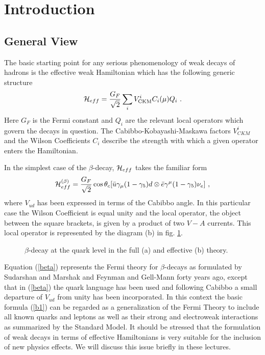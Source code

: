 \documentclass[12pt]{article}
\newcommand{\be}{\begin{equation}}
\newcommand{\ee}{\end{equation}}
\begin{document}
\setcounter{page}{1}

\section{Introduction}
\subsection{General View}
The basic starting point for any serious phenomenology of weak decays of
hadrons is the effective weak Hamiltonian which has the following generic
structure
\be\label{b1}
{\cal H}_{eff}=\frac{G_F}{\sqrt{2}}\sum_i V^i_{\rm CKM}C_i(\mu)Q_i~.
\ee
Here $G_F$ is the Fermi constant and $Q_i$ are the relevant local
operators which govern the decays in question. The Cabibbo-Kobayashi-Maskawa
factors $V^i_{CKM}$ \cite{CAB,KM} 
and the Wilson Coefficients $C_i$ \cite{OPE,ZIMM} describe the 
strength with which a given operator enters the Hamiltonian.

In the simplest case of the $\beta$-decay, ${\cal H}_{eff}$ takes 
the familiar form
\be\label{beta}
{\cal H}^{(\beta)}_{eff}=\frac{G_F}{\sqrt{2}}
\cos\theta_c[\bar u\gamma_\mu(1-\gamma_5)d \otimes
\bar e \gamma^\mu (1-\gamma_5)\nu_e]~,
\ee
where $V_{ud}$ has been expressed in terms of the Cabibbo angle. In this
particular case the Wilson Coefficient is equal unity and the local
operator, the object between the square brackets, is given by a product 
of two $V-A$ currents. This local operator is represented by the
diagram (b) in fig. \ref{L:1}.
\begin{figure}[hbt]
\vspace{0.10in}
\centerline{
\epsfysize=1.9in
}%
\vspace{0.08in}
\caption[]{
$\beta$-decay at the quark level in the full (a) and effective (b)
theory.
\label{L:1}}
\end{figure}
Equation (\ref{beta}) represents the Fermi theory for $\beta$-decays 
as formulated by Sudarshan and
Marshak \cite{SUMA} and Feynman and Gell-Mann \cite{GF} forty years ago, 
except that in (\ref{beta})
the quark language has been used and following Cabibbo a small departure of
$V_{ud}$ from unity has been incorporated. In this context the basic 
formula (\ref{b1})
can be regarded as a generalization of the Fermi Theory to include all known
quarks and leptons as well as their strong and electroweak interactions as
summarized by the Standard Model. It should be stressed that the formulation
of weak decays in terms of effective Hamiltonians is very suitable for the
inclusion of new physics effects. We will discuss this issue briefly in these
lectures.
\end{document}
